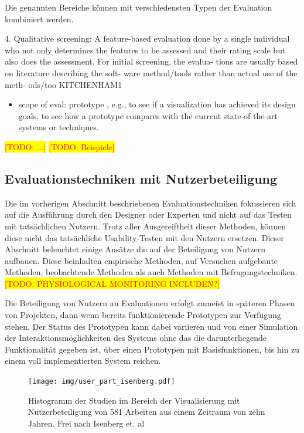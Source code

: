 \documentclass[draft=false
              ,paper=a4
              ,twoside=false
              ,fontsize=11pt
              ,headsepline
              ,BCOR10mm
              ,DIV11
              ]{scrbook}
\newcommand{\TODO}[1]{\colorbox{yellow}{\textcolor{red}{[TODO: #1]}}}
\begin{document}
Die genannten Bereiche können mit verschiedensten Typen der Evaluation kombiniert werden.

4. Qualitative screening: A feature-based evaluation done by a  single individual who not only determines the features to be assessed and their rating scale but also does the assessment. For  initial screening, the evalua- tions are usually based  on literature describing the soft- ware method/tools rather than actual use of the meth- ods/too KITCHENHAM1

\begin{itemize}
  \item scope of eval: prototype , e.g., to see if a visualization has achieved
its design goals, to see how a prototype compares with
the current state-of-the-art systems or techniques.
\end{itemize}
\TODO{...}
\TODO{Beispiele}
\fi %

\subsection{Evaluationstechniken mit Nutzerbeteiligung} %
\label{sub:evaluationstechniken_mit_nutzerbeteiligung}
Die im vorherigen Abschnitt beschriebenen Evaluationstechniken fokussieren sich auf die Ausführung durch den Designer oder Experten und nicht auf das Testen mit tatsächlichen Nutzern. Trotz aller Ausgereiftheit dieser Methoden, können diese nicht das tatsächliche Usability-Testen mit den Nutzern ersetzen. Dieser Abschnitt beleuchtet einige Ansätze die auf der Beteiligung von Nutzern aufbauen. Diese beinhalten empirische Methoden, auf Versuchen aufgebaute Methoden, beobachtende Methoden als auch Methoden mit Befragungstechniken. \TODO{PHYSIOLOGICAL MONITORING INCLUDEN?}

Die Beteiligung von Nutzern an Evaluationen erfolgt zumeist in späteren Phasen von Projekten, dann wenn bereits funktionierende Prototypen zur Verfügung stehen. Der Status des Prototypen kann dabei variieren und von einer Simulation der Interaktionsmöglichkeiten des Systems ohne das die darunterliegende Funktionalität gegeben ist, über einen Prototypen mit Basisfunktionen, bis hin zu einem voll implementierten System reichen.

\begin{figure}[htbp]
  \centering
  \texttt{[image: img/user\_part\_isenberg.pdf]}
  \caption{Histogramm der Studien im Bereich der Visualisierung mit Nutzerbeteiligung von 581 Arbeiten aus einem Zeitraum von zehn Jahren. Frei nach Isenberg et. al \cite{isenberg_systematic_2013}}
  \label{fig:figure1}
\end{figure}
\end{document}

